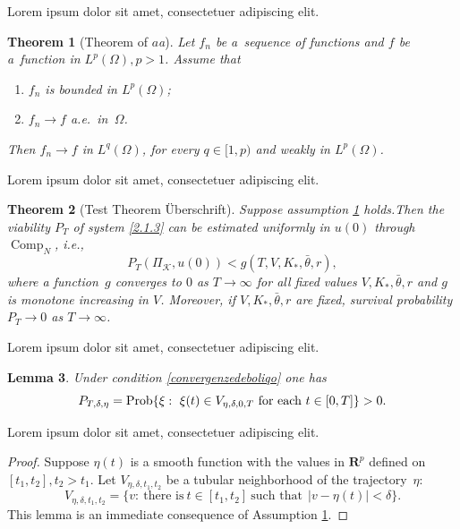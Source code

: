 \documentclass[english,ngerman]{book}%
\theoremstyle{dgdef}
\theoremstyle{dgthm}
\newtheorem{theorem}{Theorem}%
\newtheorem{lemma}[theorem]{Lemma}
\begin{document}
Lorem ipsum dolor sit amet, consectetuer adipiscing elit.

\begin{theorem}[Theorem of $a$\textit{a}]\label{convergenzedeboliqo}
  Let $f_n$ be a~sequence of functions and $f$ be a~function in
  $L^p(\Omega), p>1$. Assume that
  \begin{enumerate}
  \item $f_n$ is bounded in $L^p(\Omega)$;
  \item $f_n\to f$ a.e.\ in~$\Omega$.
  \end{enumerate}
  Then $f_n \to f$ in $L^q(\Omega)$, for every $q\in [1,p)$ and weakly
  in $L^p(\Omega)$.
\end{theorem}

Lorem ipsum dolor sit amet, consectetuer adipiscing elit.

\begin{theorem}[Test Theorem Überschrift]\label{3T1}
Suppose  assumption \ref{convergenzedeboliqo} holds.\break  Then the viability  $P_T$ of system \eqref{2.1.3} can be estimated uniformly in $u(0)$ through  $\mathop{\text{Comp}}_N$, i.e.,
\begin{equation*}
 P_T(\Pi_{\mathcal{K}}, u(0))  < g(T, V, K_*, \bar \theta, r),
\end{equation*}
 where a function~$g$ converges to $0$ as $T \to \infty$ for all fixed values $V, K_*, \bar \theta, r$ and $g$ is  monotone increasing in $V$. Moreover,  if $V, K_*, \bar \theta, r$ are fixed, survival probability $P_T \to 0 $ as $T \to \infty$.
\end{theorem}

Lorem ipsum dolor sit amet, consectetuer adipiscing elit.

\begin{lemma}\label{3L1}
  Under condition \eqref{convergenzedeboliqo} one has
  \begin{equation} \label {2.1.3}
    P_{T, \delta, \eta}= \mathop{\textnormal{Prob}}\{\xi: \ \xi(t) \in V_{\eta,  \delta, 0, T} \ \text{for each} \ t  \in [0,T] \}> 0.
  \end{equation}
\end{lemma}

Lorem ipsum dolor sit amet, consectetuer adipiscing elit.

\begin{proof}
  Suppose $\eta(t)$ is a smooth function with the values in $\textbf{R}^p$ defined on $[t_1,t_2],\allowbreak
  t_2 > t_1$. Let $V_{\eta, \delta, t_1, t_2}$ be a tubular neighborhood of the
  trajectory~$\eta$:
  \begin{equation}
    V_{\eta, \delta, t_1, t_2}=\{ v: \  \text{there is} \  t \in [t_1, t_2] \ \text{such that} \ \ |v -\eta(t)| <\delta\}. \label{2.1.2}
  \end{equation}
  This lemma is an immediate consequence of Assumption \ref{convergenzedeboliqo}.
\end{proof}
\end{document}
